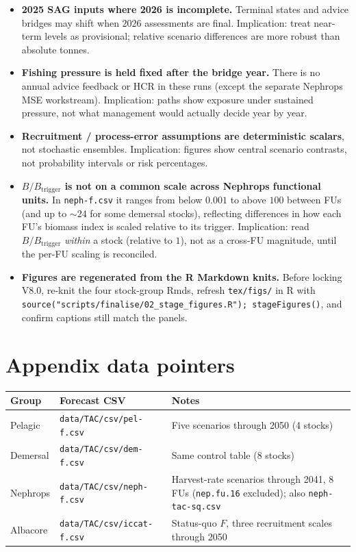 \begin{itemize}
  \item \textbf{2025 SAG inputs where 2026 is incomplete.}
        Terminal states and advice bridges may shift when 2026 assessments
        are final. Implication: treat near-term levels as provisional; relative
        scenario differences are more robust than absolute tonnes.
  \item \textbf{Fishing pressure is held fixed after the bridge year.}
        There is no annual advice feedback or HCR in these runs (except the
        separate Nephrops MSE workstream). Implication: paths show exposure
        under sustained pressure, not what management would actually decide
        year by year.
  \item \textbf{Recruitment / process-error assumptions are deterministic
        scalars}, not stochastic ensembles. Implication: figures show central
        scenario contrasts, not probability intervals or risk percentages.
  \item \textbf{$B/B_{\mathrm{trigger}}$ is not on a common scale across
        Nephrops functional units.} In \texttt{neph-f.csv} it ranges from below
        $0.001$ to above $100$ between FUs (and up to $\sim 24$ for some
        demersal stocks), reflecting differences in how each FU's biomass index
        is scaled relative to its trigger. Implication: read
        $B/B_{\mathrm{trigger}}$ \emph{within} a stock (relative to $1$), not as
        a cross-FU magnitude, until the per-FU scaling is reconciled.
  \item \textbf{Figures are regenerated from the R Markdown knits.}
        Before locking V8.0, re-knit the four stock-group Rmds, refresh
        \texttt{tex/figs/} in R with
        \texttt{source("scripts/finalise/02\_stage\_figures.R"); stageFigures()},
        and confirm captions still match the panels.
\end{itemize}

\section*{Appendix data pointers}

\begin{center}
\begin{tabular}{@{}llp{}@{}}
\toprule
Group & Forecast CSV & Notes \\
\midrule
Pelagic  & \texttt{data/TAC/csv/pel-f.csv}   & Five scenarios through 2050 (4 stocks) \\
Demersal & \texttt{data/TAC/csv/dem-f.csv}   & Same control table (8 stocks) \\
Nephrops & \texttt{data/TAC/csv/neph-f.csv}  & Harvest-rate scenarios through 2041, 8 FUs (\texttt{nep.fu.16} excluded); also \texttt{neph-tac-sq.csv} \\
Albacore & \texttt{data/TAC/csv/iccat-f.csv} & Status-quo $F$, three recruitment scales through 2050 \\
\bottomrule
\end{tabular}
\end{center}
